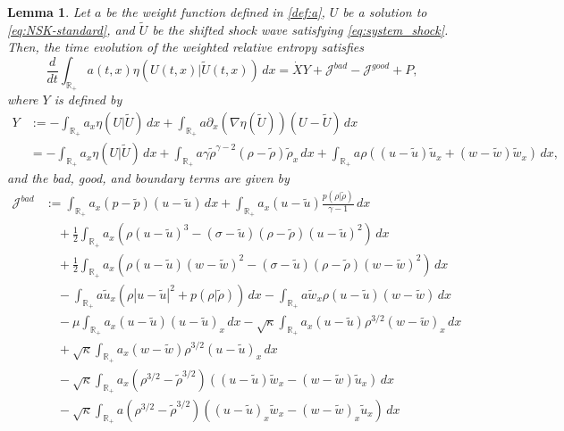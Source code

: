 \documentclass[11pt,reqno]{amsart}
\newtheorem{lemma}{Lemma}[section]
\numberwithin{equation}{section} %
\begin{document}
\begin{lemma} \label{lem:weighted-rel-entropy}
    Let $a$ be the weight function defined in \eqref{def:a}, $U$ be a solution to \eqref{eq:NSK-standard}, and $\tilde{U}$ be the shifted shock wave satisfying \eqref{eq:system_shock}. Then, the time evolution of the weighted relative entropy satisfies
   	\begin{equation}\label{est:weighted_relative_ent}
   		\frac{d}{dt}\int_{\mathbb{R}_+}a(t,x)\eta(U(t,x)|\tilde{U}(t,x))\,dx=\dot{X}Y +\mathcal{J}^{bad}-\mathcal{J}^{good}+P,
   	\end{equation}
    where $Y$ is defined by
    \begin{align*}
        Y&:=-\int_{\mathbb{R}_+}a_x\eta(U|\tilde{U})\,dx +\int_{\mathbb{R}_+}a\partial_x(\nabla\eta(\tilde{U}))(U-\tilde{U})\,dx\\
        &= -\int_{\mathbb{R}_+}a_x\eta(U|\tilde{U})\,dx + \int_{\mathbb{R}_+} a \gamma \tilde{\rho}^{\gamma-2}(\rho - \tilde{\rho})\tilde{\rho}_x\,dx + \int_{\mathbb{R}_+} a  \rho((u-\tilde{u})\tilde{u}_x + (w-\tilde{w})\tilde{w}_x)\,dx,
    \end{align*}
    and the bad, good, and boundary terms are given by
    \begin{align*}
        \mathcal{J}^{bad}&:=\int_{\mathbb{R}_+}a_x(p-\tilde{p})(u-\tilde{u})\,dx + \int_{\mathbb{R}_+}a_x(u-\tilde{u})\frac{p(\rho|\tilde{\rho})}{\gamma-1}\,dx\\
        &\quad +\frac{1}{2}\int_{\mathbb{R}_+}a_x\left(\rho(u-\tilde{u})^3-(\sigma-\tilde{u})(\rho-\tilde{\rho})(u-\tilde{u})^2\right)\,dx\\
        &\quad +\frac{1}{2}\int_{\mathbb{R}_+}a_x\left(\rho(u-\tilde{u})(w-\tilde{w})^2-(\sigma-\tilde{u})(\rho-\tilde{\rho})(w-\tilde{w})^2\right)\,dx\\
        &\quad -\int_{\mathbb{R}_+}a\tilde{u}_x(\rho|u-\tilde{u}|^2+p(\rho|\tilde{\rho}))\,dx-\int_{\mathbb{R}_+}a\tilde{w}_x\rho(u-\tilde{u})(w-\tilde{w})\,dx\\
        &\quad -\mu\int_{\mathbb{R}_+}a_x(u-\tilde{u})(u-\tilde{u})_x\,dx-\sqrt{\kappa}\int_{\mathbb{R}_+}a_x(u-\tilde{u})\rho^{3/2}(w-\tilde{w})_x\,dx\\
        &\quad +\sqrt{\kappa}\int_{\mathbb{R}_+}a_x(w-\tilde{w})\rho^{3/2}(u-\tilde{u})_x\,dx\\
        &\quad -\sqrt{\kappa}\int_{\mathbb{R}_+}a_x(\rho^{3/2}-\tilde{\rho}^{3/2})((u-\tilde{u})\tilde{w}_x-(w-\tilde{w})\tilde{u}_x)\,dx\\
        &\quad -\sqrt{\kappa}\int_{\mathbb{R}_+}a(\rho^{3/2}-\tilde{\rho}^{3/2})((u-\tilde{u})_x\tilde{w}_x-(w-\tilde{w})_x\tilde{u}_x)\,dx\\

\end{align*}
\end{lemma}
\end{document}

